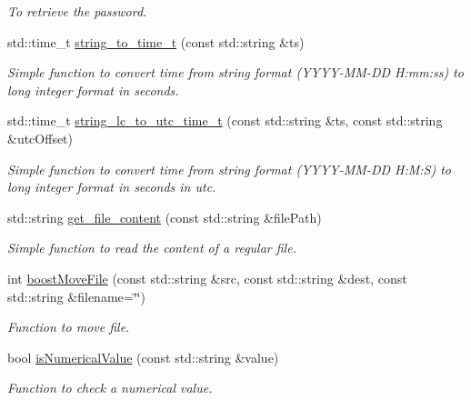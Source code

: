 \begin{DoxyCompactItemize}
\begin{DoxyCompactList}\small\item\em To retrieve the password. \item\end{DoxyCompactList}\item 
std::time\_\-t \hyperlink{namespacevishnu_ace1a774c9d738133e7cdfe505d358764}{string\_\-to\_\-time\_\-t} (const std::string \&ts)
\begin{DoxyCompactList}\small\item\em Simple function to convert time from string format (YYYY-\/MM-\/DD H:mm:ss) to long integer format in seconds. \item\end{DoxyCompactList}\item 
std::time\_\-t \hyperlink{namespacevishnu_afd97b7ec4bd356080411b31cabd6a375}{string\_\-lc\_\-to\_\-utc\_\-time\_\-t} (const std::string \&ts, const std::string \&utcOffset)
\begin{DoxyCompactList}\small\item\em Simple function to convert time from string format (YYYY-\/MM-\/DD H:M:S) to long integer format in seconds in utc. \item\end{DoxyCompactList}\item 
std::string \hyperlink{namespacevishnu_a50b77ca8a04c384cba2b8b6cdec4a26f}{get\_\-file\_\-content} (const std::string \&filePath)
\begin{DoxyCompactList}\small\item\em Simple function to read the content of a regular file. \item\end{DoxyCompactList}\item 
int \hyperlink{namespacevishnu_a0e3a3913b049d96a08712f45d71e86cb}{boostMoveFile} (const std::string \&src, const std::string \&dest, const std::string \&filename=\char`\"{}\char`\"{})
\begin{DoxyCompactList}\small\item\em Function to move file. \item\end{DoxyCompactList}\item 
bool \hyperlink{namespacevishnu_af7097af6e7099315cd385d62c560d131}{isNumericalValue} (const std::string \&value)
\begin{DoxyCompactList}\small\item\em Function to check a numerical value. \item\end{DoxyCompactList}\item 

\end{DoxyCompactItemize}
